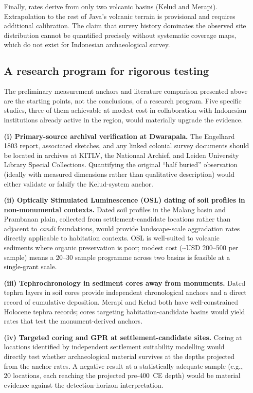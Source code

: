 \documentclass[12pt,a4paper]{article}
\begin{document}
Finally, rates derive from only two volcanic basins (Kelud and Merapi). Extrapolation to the rest of Java's volcanic terrain is provisional and requires additional calibration. The claim that survey history dominates the observed site distribution cannot be quantified precisely without systematic coverage maps, which do not exist for Indonesian archaeological survey.

\subsection{A research program for rigorous testing}
\label{sec:research_program}

The preliminary measurement anchors and literature comparison presented above are the starting points, not the conclusions, of a research program. Five specific studies, three of them achievable at modest cost in collaboration with Indonesian institutions already active in the region, would materially upgrade the evidence.

\textbf{(i) Primary-source archival verification at Dwarapala.} The Engelhard 1803 report, associated sketches, and any linked colonial survey documents should be located in archives at KITLV, the Nationaal Archief, and Leiden University Library Special Collections. Quantifying the original ``half buried'' observation (ideally with measured dimensions rather than qualitative description) would either validate or falsify the Kelud-system anchor.

\textbf{(ii) Optically Stimulated Luminescence (OSL) dating of soil profiles in non-monumental contexts.} Dated soil profiles in the Malang basin and Prambanan plain, collected from settlement-candidate locations rather than adjacent to \textit{candi} foundations, would provide landscape-scale aggradation rates directly applicable to habitation contexts. OSL is well-suited to volcanic sediments where organic preservation is poor; modest cost (\textasciitilde USD 200--500 per sample) means a 20--30 sample programme across two basins is feasible at a single-grant scale.

\textbf{(iii) Tephrochronology in sediment cores away from monuments.} Dated tephra layers in soil cores provide independent chronological anchors and a direct record of cumulative deposition. Merapi and Kelud both have well-constrained Holocene tephra records; cores targeting habitation-candidate basins would yield rates that test the monument-derived anchors.

\textbf{(iv) Targeted coring and GPR at settlement-candidate sites.} Coring at locations identified by independent settlement suitability modelling \citep[see][]{amien_synthesis_forthcoming} would directly test whether archaeological material survives at the depths projected from the anchor rates. A negative result at a statistically adequate sample (e.g., 20 locations, each reaching the projected pre-400~CE depth) would be material evidence against the detection-horizon interpretation.
\end{document}
